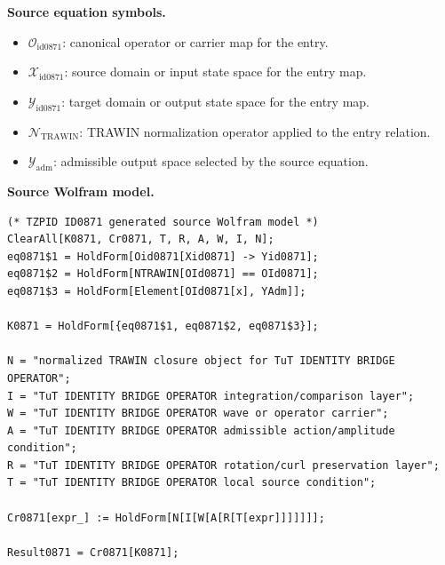 \begin{minipage}[t]{0.49\linewidth}
\begingroup
\small
\raggedright
\textbf{Source equation symbols.}\par
\begin{itemize}[leftmargin=1.35em,itemsep=1pt,topsep=1pt,parsep=0pt]
    \item $\mathcal{O}_{\mathrm{id0871}}$: canonical operator or carrier map for the entry.
    \item $\mathcal{X}_{\mathrm{id0871}}$: source domain or input state space for the entry map.
    \item $\mathcal{Y}_{\mathrm{id0871}}$: target domain or output state space for the entry map.
    \item $\mathcal{N}_{\mathrm{TRAWIN}}$: TRAWIN normalization operator applied to the entry relation.
    \item $\mathcal{Y}_{\mathrm{adm}}$: admissible output space selected by the source equation.
\end{itemize}
\endgroup
\end{minipage}\hfill
\begin{minipage}[t]{0.47\linewidth}
\begingroup
\scriptsize
\raggedright
\textbf{Source Wolfram model.}\par
\begin{Verbatim}[fontsize=\tiny,breaklines=true,breakanywhere=true]
(* TZPID ID0871 generated source Wolfram model *)
ClearAll[K0871, Cr0871, T, R, A, W, I, N];
eq0871$1 = HoldForm[Oid0871[Xid0871] -> Yid0871];
eq0871$2 = HoldForm[NTRAWIN[OId0871] == OId0871];
eq0871$3 = HoldForm[Element[OId0871[x], YAdm]];

K0871 = HoldForm[{eq0871$1, eq0871$2, eq0871$3}];

N = "normalized TRAWIN closure object for TuT IDENTITY BRIDGE OPERATOR";
I = "TuT IDENTITY BRIDGE OPERATOR integration/comparison layer";
W = "TuT IDENTITY BRIDGE OPERATOR wave or operator carrier";
A = "TuT IDENTITY BRIDGE OPERATOR admissible action/amplitude condition";
R = "TuT IDENTITY BRIDGE OPERATOR rotation/curl preservation layer";
T = "TuT IDENTITY BRIDGE OPERATOR local source condition";

Cr0871[expr_] := HoldForm[N[I[W[A[R[T[expr]]]]]]];

Result0871 = Cr0871[K0871];
\end{Verbatim}
\endgroup
\end{minipage}

